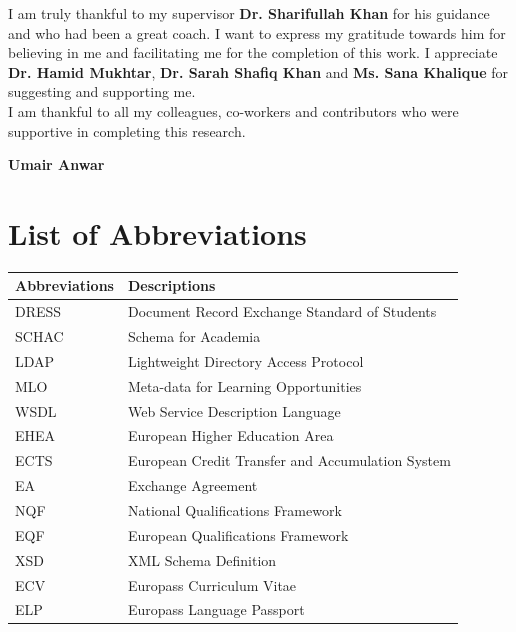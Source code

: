 \documentclass[12pt,a4paper,oneside]{book}
\begin{document}
I am truly thankful to my supervisor {\bfseries Dr. Sharifullah Khan} for his guidance and who had been a great coach. I want to express my gratitude towards him for believing in me and facilitating me for the completion of this work. I appreciate {\bfseries Dr. Hamid Mukhtar}, {\bfseries Dr. Sarah Shafiq Khan} and {\bfseries Ms. Sana Khalique} for suggesting and supporting me. \\

I am thankful to all my colleagues, co-workers and contributors who were supportive in completing this research.

\begin{flushright} \textbf{Umair Anwar} \end{flushright}

\tableofcontents
%
%
%
\chapter*{List of Abbreviations}

\begin{table}[h]
    \renewcommand{\arraystretch}{1.3}
    \label{table:table1}
     \begin{tabular}{ll}
        \hline\hline
            {\bfseries Abbreviations} & {\bfseries Descriptions} \\
            \hline                                      %
            DRESS & Document Record Exchange Standard of Students  \\
            SCHAC & Schema for Academia  \\
            LDAP & Lightweight Directory Access Protocol \\
            MLO & Meta-data for Learning Opportunities  \\
            WSDL & Web Service Description Language  \\
            EHEA & European Higher Education Area  \\
            ECTS & European Credit Transfer and Accumulation System  \\
            EA & Exchange Agreement  \\
            NQF & National Qualifications Framework  \\
            EQF & European Qualifications Framework  \\
            XSD & XML Schema Definition  \\
            ECV & Europass Curriculum Vitae \\
            ELP & Europass Language Passport \\
            
            \hline                          %
    \end{tabular}
\end{table}
\end{document}

